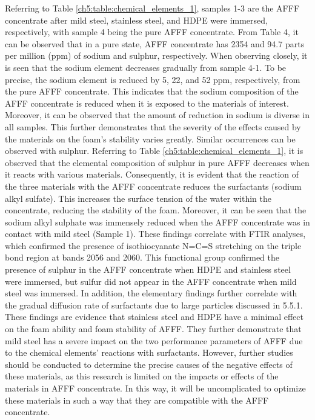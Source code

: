 \documentclass[12pt]{report}
\begin{document}
Referring to Table \ref{ch5:table:chemical_elements_1}, samples 1-3 are the AFFF concentrate after mild steel, stainless steel, and HDPE were immersed, respectively, with sample 4 being the pure AFFF concentrate. From Table 4, it can be observed that in a pure state, AFFF concentrate has 2354 and 94.7 parts per million (ppm) of sodium and sulphur, respectively. When observing closely, it is seen that the sodium element decreases gradually from sample 4-1. To be precise, the sodium element is reduced by 5, 22, and 52 ppm, respectively, from the pure AFFF concentrate. This indicates that the sodium composition of the AFFF concentrate is reduced when it is exposed to the materials of interest. Moreover, it can be observed that the amount of reduction in sodium is diverse in all samples. This further demonstrates that the severity of the effects caused by the materials on the foam’s stability varies greatly.
Similar occurrences can be observed with sulphur. Referring to Table \ref{ch5:table:chemical_elements_1}, it is observed that the elemental composition of sulphur in pure AFFF decreases when it reacts with various materials. Consequently, it is evident that the reaction of the three materials with the AFFF concentrate reduces the surfactants (sodium alkyl sulfate). This increases the surface tension of the water within the concentrate, reducing the stability of the foam. Moreover, it can be seen that the sodium alkyl sulphate was immensely reduced when the AFFF concentrate was in contact with mild steel (Sample 1). These findings correlate with FTIR analyses, which confirmed the presence of isothiocyanate N=C=S stretching on the triple bond region at bands 2056 and 2060. This functional group confirmed the presence of sulphur in the AFFF concentrate when HDPE and stainless steel were immersed, but sulfur did not appear in the AFFF concentrate when mild steel was immersed.
In addition, the elementary findings further correlate with the gradual diffusion rate of surfactants due to large particles discussed in 5.5.1. These findings are evidence that stainless steel and HDPE have a minimal effect on the foam ability and foam stability of AFFF. They further demonstrate that mild steel has a severe impact on the two performance parameters of AFFF due to the chemical elements’ reactions with surfactants. However, further studies should be conducted to determine the precise causes of the negative effects of these materials, as this research is limited on the impacts or effects of the materials in AFFF concentrate. In this way, it will be uncomplicated to optimize these materials in such a way that they are compatible with the AFFF concentrate.
\end{document}
